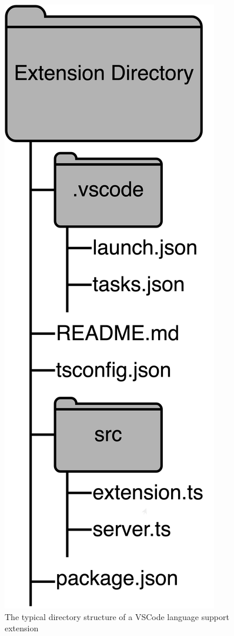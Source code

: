 \documentclass{article}
\begin{document}
\begin{figure}
    \begin{center}
        \includegraphics[height=0.3\textheight]{directory-structure.png}
        \caption{The typical directory structure of a VSCode language support extension}
    \end{center}
    \label{fig:directory-structure}
\end{figure}
\end{document}
